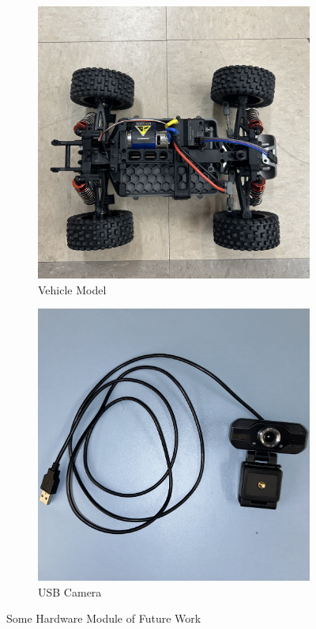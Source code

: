 \documentclass[journal,transmag]{IEEEtran}
\begin{document}
\begin{figure}[h]
    \centering
    \begin{subfigure}[b]{0.225\textwidth}
        \includegraphics[width=\textwidth]{Model Car.jpeg}
        \caption{Vehicle Model}
        \label{fig:Model Car}
    \end{subfigure}
    \hfill
    \begin{subfigure}[b]{0.225\textwidth}
        \includegraphics[width=\textwidth]{Model Car Camera.jpeg}
        \caption{USB Camera}
        \label{fig:Model Car Camera}
    \end{subfigure}
    \caption{Some Hardware Module of Future Work}
    \label{fig:Some Hardware Module of Future Work}
\end{figure}
\end{document}
